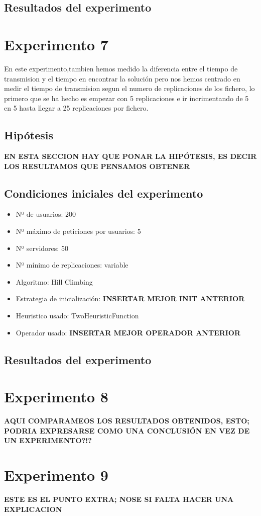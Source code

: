 \documentclass[a4paper,10pt]{report}
\begin{document}
		\section*{Resultados del experimento}
		
		
	\chapter*{Experimento 7}

		En este experimento,tambien hemos medido la diferencia entre el tiempo de transmision y el tiempo en encontrar la solución pero nos hemos centrado en medir el tiempo de transmision segun el numero de replicaciones de los fichero, lo primero que se ha hecho es empezar con 5 replicaciones e ir incrimentando de 5 en 5 hasta llegar a 25 replicaciones por fichero.\newline
		
		\section*{Hipótesis}
		\textbf{EN ESTA SECCION HAY QUE PONAR LA HIPÓTESIS, ES DECIR LOS RESULTAMOS QUE PENSAMOS OBTENER}

		\section*{Condiciones iniciales del experimento}
		\begin{itemize}
		    \item Nº de usuarios: 200
    		\item Nº máximo de peticiones por usuarios: 5
    		\item Nº servidores: 50
    		\item Nº mínimo de replicaciones: variable
    		\item Algoritmo: Hill Climbing
    		\item Estrategia de inicialización: \textbf{INSERTAR MEJOR INIT ANTERIOR}
    		\item Heuristico usado: TwoHeuristicFunction
    		\item Operador usado:  \textbf{INSERTAR MEJOR OPERADOR ANTERIOR}
		\end{itemize}

		\section*{Resultados del experimento}
		
		
	\chapter*{Experimento 8}

		\textbf{AQUI COMPARAMEOS LOS RESULTADOS OBTENIDOS, ESTO;  PODRIA EXPRESARSE
		        COMO UNA CONCLUSIÓN EN VEZ DE UN EXPERIMENTO?!?}
		
	\chapter*{Experimento 9}

		\textbf{ESTE ES EL PUNTO EXTRA; NOSE SI FALTA HACER UNA EXPLICACION}
		
		
\end{document}
